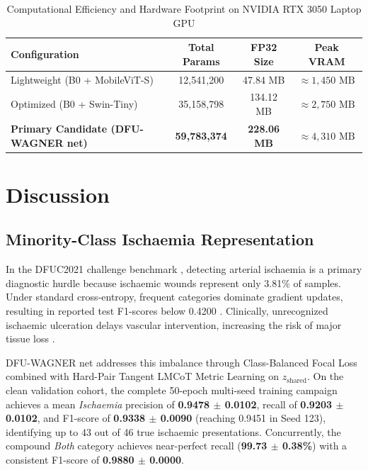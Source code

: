 \documentclass[journal]{IEEEtran}
\begin{document}
\begin{table}[h]
\centering
\caption{Computational Efficiency and Hardware Footprint on NVIDIA RTX 3050 Laptop GPU}
\label{tab:compute_efficiency}
\begin{tabular}{lccc}
\toprule
\textbf{Configuration} & \textbf{Total Params} & \textbf{FP32 Size} & \textbf{Peak VRAM} \\
\midrule
Lightweight (B0 + MobileViT-S) & 12,541,200 & 47.84 MB & $\approx 1,450\text{ MB}$ \\
Optimized (B0 + Swin-Tiny) & 35,158,798 & 134.12 MB & $\approx 2,750\text{ MB}$ \\
\textbf{Primary Candidate (DFU-WAGNER net)} & \textbf{59,783,374} & \textbf{228.06 MB} & \textbf{$\approx 4,310\text{ MB}$} \\
\bottomrule
\end{tabular}
\end{table}

\section{Discussion}

\subsection{Minority-Class Ischaemia Representation}
In the DFUC2021 challenge benchmark \cite{cassidy2021diabetic}, detecting arterial ischaemia is a primary diagnostic hurdle because ischaemic wounds represent only 3.81\% of samples. Under standard cross-entropy, frequent categories dominate gradient updates, resulting in reported test F1-scores below 0.4200 \cite{galdran2021convolutional, toofanee2023dfu}. Clinically, unrecognized ischaemic ulceration delays vascular intervention, increasing the risk of major tissue loss \cite{armstrong1998validation}.

DFU-WAGNER net addresses this imbalance through Class-Balanced Focal Loss combined with Hard-Pair Tangent LMCoT Metric Learning on $z_{\text{shared}}$. On the clean validation cohort, the complete 50-epoch multi-seed training campaign achieves a mean \textit{Ischaemia} precision of \textbf{0.9478 $\pm$ 0.0102}, recall of \textbf{0.9203 $\pm$ 0.0102}, and F1-score of \textbf{0.9338 $\pm$ 0.0090} (reaching 0.9451 in Seed 123), identifying up to 43 out of 46 true ischaemic presentations. Concurrently, the compound \textit{Both} category achieves near-perfect recall (\textbf{99.73 $\pm$ 0.38\%}) with a consistent F1-score of \textbf{0.9880 $\pm$ 0.0000}.
\end{document}
